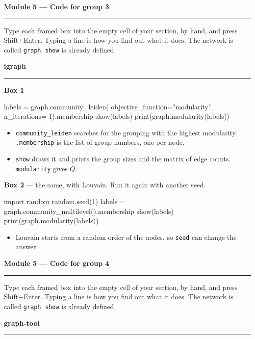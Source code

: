 \documentclass[a4paper, 11pt]{extarticle}
\begin{document}
{\LARGE\bfseries Module 5 --- Code for group 3}

\vspace{0.2em}
\rule{\textwidth}{0.8pt}

Type each framed box into the empty cell of your section, by hand, and press Shift+Enter. Typing a line is how you find out what it does. The network is called \texttt{graph}. \texttt{show} is already defined.

\medskip
{\Large\bfseries igraph}\par
\vspace{-0.3em}\rule{\textwidth}{0.4pt}

\textbf{Box 1}
\begin{code}
labels = graph.community_leiden(
    objective_function="modularity",
    n_iterations=-1).membership
show(labels)
print(graph.modularity(labels))
\end{code}
\begin{itemize}
\item \texttt{community\_leiden} searches for the grouping with the highest modularity. \texttt{.membership} is the list of group numbers, one per node.
\item \texttt{show} draws it and prints the group sizes and the matrix of edge counts. \texttt{modularity} gives $Q$.
\end{itemize}

\textbf{Box 2} --- the same, with Louvain. Run it again with another seed.
\begin{code}
import random
random.seed(1)
labels = graph.community_multilevel().membership
show(labels)
print(graph.modularity(labels))
\end{code}
\begin{itemize}
\item Louvain starts from a random order of the nodes, so \texttt{seed} can change the answer.
\end{itemize}

\medskip

\newpage

{\LARGE\bfseries Module 5 --- Code for group 4}

\vspace{0.2em}
\rule{\textwidth}{0.8pt}

Type each framed box into the empty cell of your section, by hand, and press Shift+Enter. Typing a line is how you find out what it does. The network is called \texttt{graph}. \texttt{show} is already defined.

\medskip
{\Large\bfseries graph-tool}\par
\vspace{-0.3em}\rule{\textwidth}{0.4pt}
\end{document}
